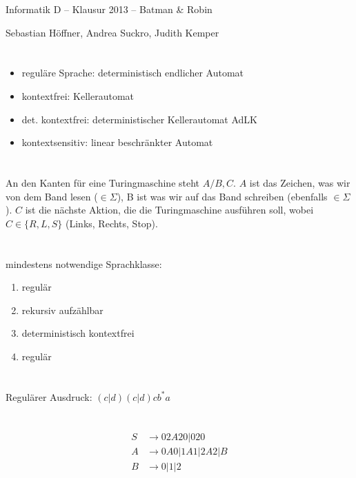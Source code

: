 \documentclass{article}
\begin{document}
\begin{center}
  \Large{Informatik D -- Klausur 2013 -- Batman \& Robin}

  \large{Sebastian Höffner, Andrea Suckro, Judith Kemper}
\end{center}

\section{}
\begin{itemize}
	\item reguläre Sprache: deterministisch endlicher Automat
  \item kontextfrei: Kellerautomat
  \item det. kontextfrei: deterministischer Kellerautomat AdLK
  \item kontextsensitiv: linear beschränkter Automat
\end{itemize}

\section{}
An den Kanten für eine Turingmaschine steht $A/B,C$. $A$ ist das Zeichen, was wir von dem Band lesen ($\in \Sigma$), B ist was wir auf das Band schreiben (ebenfalls $\in \Sigma$). $C$ ist die nächste Aktion, die die Turingmaschine ausführen soll, wobei $C \in \{R, L, S\}$ (Links, Rechts, Stop). 

\section{}
mindestens notwendige Sprachklasse:
\begin{enumerate}
	\item regulär
  \item rekursiv aufzählbar
  \item deterministisch kontextfrei
  \item regulär
\end{enumerate}

\section{}
Regulärer Ausdruck: $(c|d)(c|d)cb^*a$

\section{}
\begin{align*}
S&\rightarrow 02A20 | 020\\
A&\rightarrow 0A0 | 1A1 | 2A2 | B\\
B&\rightarrow 0|1|2
\end{align*}
\end{document}
